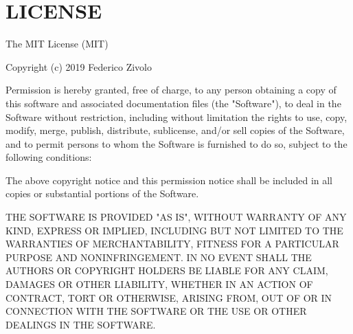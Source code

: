 \chapter{LICENSE}
\hypertarget{md_node__modules_2_0dpopperjs_2core_2_l_i_c_e_n_s_e}{}\label{md_node__modules_2_0dpopperjs_2core_2_l_i_c_e_n_s_e}
The MIT License (MIT)

Copyright (c) 2019 Federico Zivolo

Permission is hereby granted, free of charge, to any person obtaining a copy of this software and associated documentation files (the "{}\+Software"{}), to deal in the Software without restriction, including without limitation the rights to use, copy, modify, merge, publish, distribute, sublicense, and/or sell copies of the Software, and to permit persons to whom the Software is furnished to do so, subject to the following conditions\+:

The above copyright notice and this permission notice shall be included in all copies or substantial portions of the Software.

THE SOFTWARE IS PROVIDED "{}\+AS IS"{}, WITHOUT WARRANTY OF ANY KIND, EXPRESS OR IMPLIED, INCLUDING BUT NOT LIMITED TO THE WARRANTIES OF MERCHANTABILITY, FITNESS FOR A PARTICULAR PURPOSE AND NONINFRINGEMENT. IN NO EVENT SHALL THE AUTHORS OR COPYRIGHT HOLDERS BE LIABLE FOR ANY CLAIM, DAMAGES OR OTHER LIABILITY, WHETHER IN AN ACTION OF CONTRACT, TORT OR OTHERWISE, ARISING FROM, OUT OF OR IN CONNECTION WITH THE SOFTWARE OR THE USE OR OTHER DEALINGS IN THE SOFTWARE. 